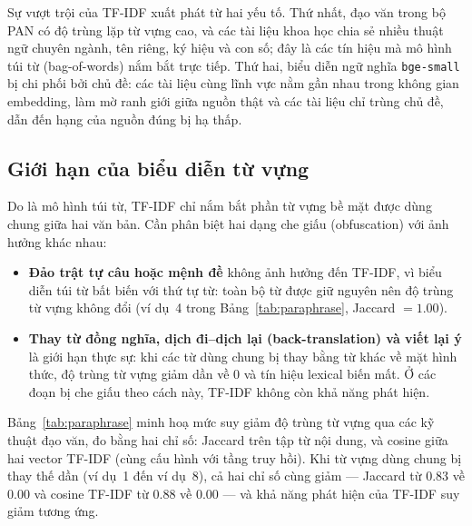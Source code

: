 Sự vượt trội của TF-IDF xuất phát từ hai yếu tố. Thứ nhất, đạo văn trong bộ PAN có độ trùng
lặp từ vựng cao, và các tài liệu khoa học chia sẻ nhiều thuật ngữ chuyên ngành, tên riêng,
ký hiệu và con số; đây là các tín hiệu mà mô hình túi từ (bag-of-words) nắm bắt trực tiếp.
Thứ hai, biểu diễn ngữ nghĩa \texttt{bge-small} bị chi phối bởi chủ đề: các tài liệu cùng
lĩnh vực nằm gần nhau trong không gian embedding, làm mờ ranh giới giữa nguồn thật và các
tài liệu chỉ trùng chủ đề, dẫn đến hạng của nguồn đúng bị hạ thấp.

\subsection{Giới hạn của biểu diễn từ vựng}

Do là mô hình túi từ, TF-IDF chỉ nắm bắt phần từ vựng bề mặt được dùng chung giữa hai văn
bản. Cần phân biệt hai dạng che giấu (obfuscation) với ảnh hưởng khác nhau:

\begin{itemize}
  \item \textbf{Đảo trật tự câu hoặc mệnh đề} không ảnh hưởng đến TF-IDF, vì biểu diễn túi từ
  bất biến với thứ tự từ: toàn bộ từ được giữ nguyên nên độ trùng từ vựng không đổi (ví dụ~4
  trong Bảng~\ref{tab:paraphrase}, Jaccard $=1.00$).
  \item \textbf{Thay từ đồng nghĩa, dịch đi--dịch lại (back-translation) và viết lại ý} là giới
  hạn thực sự: khi các từ dùng chung bị thay bằng từ khác về mặt hình thức, độ trùng từ vựng
  giảm dần về $0$ và tín hiệu lexical biến mất. Ở các đoạn bị che giấu theo cách này, TF-IDF
  không còn khả năng phát hiện.
\end{itemize}

Bảng~\ref{tab:paraphrase} minh hoạ mức suy giảm độ trùng từ vựng qua các kỹ thuật đạo văn,
đo bằng hai chỉ số: Jaccard trên tập từ nội dung, và cosine giữa hai vector TF-IDF (cùng cấu
hình với tầng truy hồi). Khi từ vựng dùng chung bị thay thế dần (ví dụ~1 đến ví dụ~8), cả hai
chỉ số cùng giảm --- Jaccard từ $0.83$ về $0.00$ và cosine TF-IDF từ $0.88$ về $0.00$ ---
và khả năng phát hiện của TF-IDF suy giảm tương ứng.

